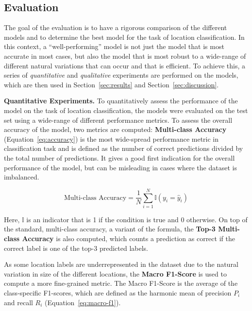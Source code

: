 \documentclass[a4paper]{article}
\begin{document}

  \subsection{Evaluation} %
  \label{sub:evaluation}

  The goal of the evaluation is to have a rigorous comparison of the different
  models and to determine the best model for the task of location
  classification. In this context, a ``well-performing'' model is not just the
  model that is most accurate in most cases, but also the model that is most
  robust to a wide-range of different natural variations that can occur and that
  is efficient. To achieve this, a series of \textit{quantitative} and
  \textit{qualitative} experiments are performed on the models, which are then
  used in Section~\ref{sec:results} and Section~\ref{sec:discussion}.

  \textbf{Quantitative Experiments.} To quantitatively assess the performance of
  the model on the task of location classification, the models were evaluated on
  the test set using a wide-range of different performance metrics. To assess
  the overall accuracy of the model, two metrics are computed:
  \textbf{Multi-class Accuracy} (Equation~\ref{eq:accuracy}) is the most
  wide-spread performance metric in classification task and is defined as the
  number of correct predictions divided by the total number of predictions.
  It gives a good first indication for the overall performance of the model, but
  can be misleading in cases where the dataset is imbalanced.

  \begin{equation}
    \text{Multi-class Accuracy} = \frac{1}{N} \sum_{i=1}^{N} \mathbb{I}(y_i =
    \hat{y}_i) 
    \label{eq:accuracy}
  \end{equation}

  Here, $\mathbb{I}$ is an indicator that is 1 if the condition is true and 0
  otherwise. On top of the standard, multi-class accuracy, a variant of the
  formula, the \textbf{Top-3 Multi-class Accuracy} is also computed, which
  counts a prediction as correct if the correct label is one of the top-3
  predicted labels.

  As some location labels are underrepresented in the dataset due to the natural
  variation in size of the different locations, the \textbf{Macro F1-Score} is
  used to compute a more fine-grained metric. The Macro F1-Score is the average
  of the class-specific F1-scores, which are defined as the harmonic mean of
  precision $P_i$ and recall $R_i$ (Equation~\ref{eq:macro-f1}).
\end{document}
